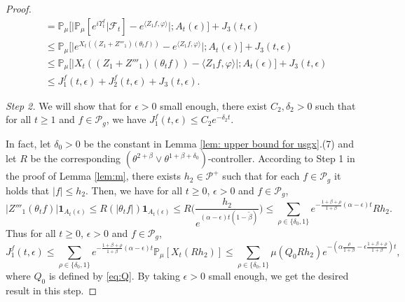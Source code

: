 \documentclass[EJP]{ejpecp} %
\begin{document}
\begin{proof}
\begin{align}
  	& = \mathbb{P}_{\mu}\Big[ \big| \mathbb{P}_\mu [e^{i\Upsilon^f_t}| \mathscr F_{t}]-e^{\langle Z_1f, \varphi\rangle} \big| ; A_{t}(\epsilon) \Big] + J_3(t,\epsilon) \\
  	& \leq \mathbb{P}_\mu \Big[ \big|e^{X_{t}((Z_1+Z'''_1) (\theta_t f))}-e^{\langle Z_1f, \varphi\rangle} \big| ; A_{t}(\epsilon) \Big]+  J_3(t,\epsilon) \\
  	& \leq \mathbb{P}_\mu \Big[ \big| X_{t} ( (Z_1+Z'''_1)(\theta_t f)) - \langle Z_1f, \varphi\rangle \big| ;A_{t}(\epsilon)\Big]+  J_3(t,\epsilon) \\
  	& \leq J^f_1(t,\epsilon) + J^f_2(t,\epsilon)+ J_3(t,\epsilon).
\end{align}

	\emph{Step 2.} We will show that for $\epsilon>0$ small enough, there exist  $C_2, \delta_2>0$ such that for all $t\geq 1$ and $f \in \mathcal P_g$, we have $ J^f_1(t,\epsilon) \leq C_2e^{-\delta_2 t}$.

	In fact, let $\delta_0 >0$ be the constant in Lemma \ref{lem: upper bound for usgx}.(7) and let $R$ be the corresponding $(\theta^{2+\beta}\vee \theta^{1+\beta+\delta_0})$-controller.
	According to
	Step 1 in the proof of Lemma \ref{lem:m}, there exists $h_{2} \in \mathcal P^+$ such that for each $f \in \mathcal P_g$ it holds that $|f| \leq h_{2}$.
	Then, we have for all $t\geq 0$, $\epsilon> 0$ and $f\in \mathcal P_g$,
\begin{equation}
	|Z'''_1(\theta_t f)|\mathbf{1}_{A_{t}(\epsilon)}
    \leq R(|\theta_{t} f|)\mathbf{1}_{A_{t}(\epsilon)}
    \leq R \Big(\frac{h_{2}}{e^{(\alpha-\epsilon)t(1-\tilde \beta)}}\Big)
    \leq \sum_{\rho \in \{\delta_0,1\}}e^{-\frac{1+\beta+\rho}{1+\beta}(\alpha-\epsilon)t}Rh_{2}.
\end{equation}
	Thus for all $t\geq 0$, $\epsilon> 0$ and $f\in \mathcal P_g$,
\begin{equation}
	\label{eq: estimate of J1}
  	J^f_1(t,\epsilon)
	\leq \sum_{\rho \in \{\delta_0,1\}}e^{-\frac{1+\beta+\rho}{1+\beta}(\alpha-\epsilon)t}\mathbb{P}_{\mu}[X_{t}(Rh_2)]
	\leq \sum_{\rho \in \{\delta_0,1\}} \mu(Q_0 R h_{2}) e^{-(\alpha\frac{\rho}{1+\beta}-\epsilon\frac{1+\beta+\rho}{1+\beta})t},
\end{equation}
	where $Q_0$ is defined by \eqref{eq:Q}.
	By taking $\epsilon>0$ small enough, we get the desired result in this step.


\end{proof}
\end{document}
